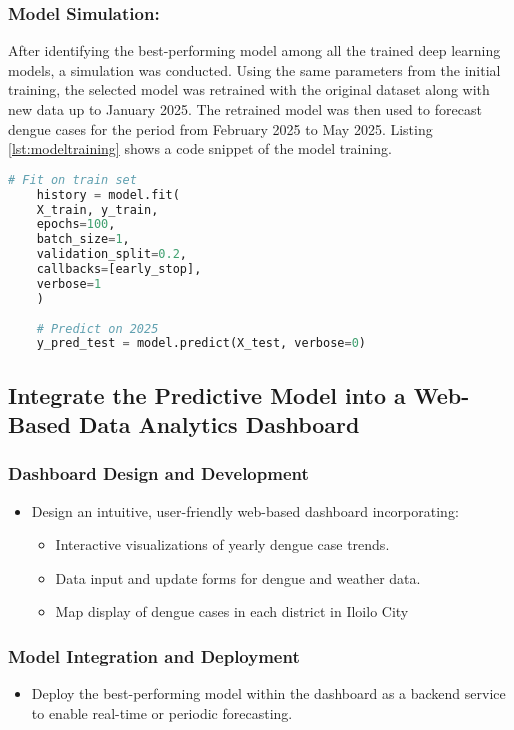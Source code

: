\subsubsection{Model Simulation:}
After identifying the best-performing model among all the trained deep learning models, a simulation was conducted. Using the same parameters from the initial training, the selected model was retrained with the original dataset along with new data up to January 2025. The retrained model was then used to forecast dengue cases for the period from February 2025 to May 2025. Listing \ref{lst:modeltraining} shows a code snippet of the model training.

\begin{lstlisting}[language=Python, 
	basicstyle=\ttfamily\small, 
	keywordstyle=\color{blue}, 
	caption={Code Snippet for Model Training}, 
	label={lst:modeltraining}]
	# Fit on train set
	history = model.fit(
	X_train, y_train,
	epochs=100,
	batch_size=1,
	validation_split=0.2,
	callbacks=[early_stop],
	verbose=1
	)
	
	# Predict on 2025
	y_pred_test = model.predict(X_test, verbose=0)
\end{lstlisting}



\subsection{Integrate the Predictive Model into a Web-Based Data Analytics Dashboard}

\subsubsection{Dashboard Design and Development}
\begin{itemize}
	\item Design an intuitive, user-friendly web-based dashboard incorporating:
	\begin{itemize}
		\item Interactive visualizations of yearly dengue case trends.
		\item Data input and update forms for dengue and weather data.
		\item Map display of dengue cases in each district in Iloilo City
	\end{itemize}
\end{itemize}

\subsubsection{Model Integration and Deployment}
\begin{itemize}
	\item Deploy the best-performing model within the dashboard as a backend service to enable real-time or periodic forecasting.
\end{itemize}


